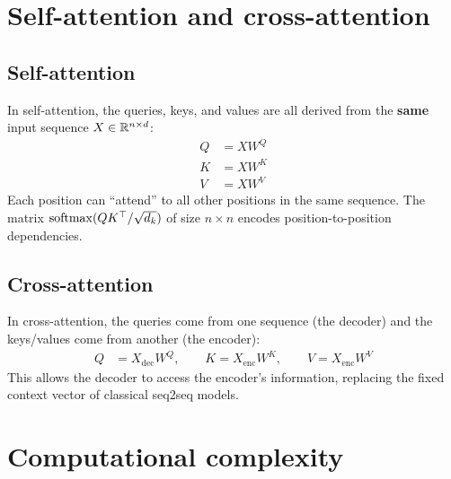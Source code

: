 \section{Self-attention and cross-attention}
\label{sec:self-cross-attention}

\subsection{Self-attention}

\begin{definition}
In self-attention, the queries, keys, and values are all derived from the
\textbf{same} input sequence $X \in \mathbb{R}^{n \times d}$:
\begin{align}
Q &= X W^Q \label{eq:self-q} \\
K &= X W^K \label{eq:self-k} \\
V &= X W^V \label{eq:self-v}
\end{align}
Each position can ``attend'' to all other positions in the same sequence.
The matrix $\mathrm{softmax}(QK^\top / \sqrt{d_k})$ of size $n \times n$ encodes
position-to-position dependencies.
\end{definition}

\subsection{Cross-attention}

\begin{definition}
In cross-attention, the queries come from one sequence (the decoder) and the
keys/values come from another (the encoder):
\begin{align}
Q &= X_{\text{dec}} W^Q, \qquad
K = X_{\text{enc}} W^K, \qquad
V = X_{\text{enc}} W^V
\end{align}
This allows the decoder to access the encoder's information, replacing the
fixed context vector of classical seq2seq models.
\end{definition}

\section{Computational complexity}
\label{sec:attention-complexity}

